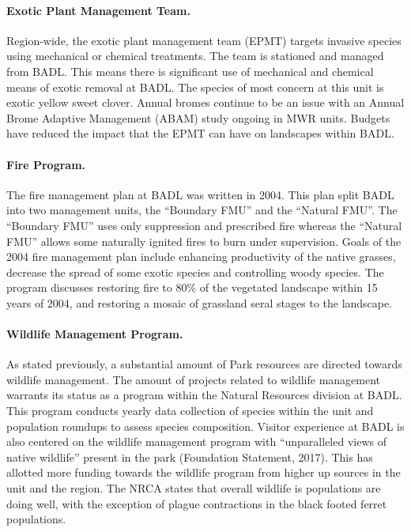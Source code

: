 \paragraph{Exotic Plant Management Team.} Region-wide, the exotic plant management team (EPMT) targets invasive species using mechanical or chemical treatments. 
The team is stationed and managed from BADL.
This means there is significant use of mechanical and chemical means of exotic removal at BADL. 
The species of most concern at this unit is exotic yellow sweet clover. 
Annual bromes continue to be an issue with an Annual Brome Adaptive Management (ABAM) study ongoing in MWR units.
Budgets have reduced the impact that the EPMT can have on landscapes within BADL.

\paragraph{Fire Program.} The fire management plan at BADL was written in 2004. 
This plan split BADL into two management units, the ``Boundary FMU'' and the ``Natural FMU''. 
The ``Boundary FMU'' uses only suppression and prescribed fire whereas the ``Natural FMU'' allows some naturally ignited fires to burn under supervision.
Goals of the 2004 fire management plan include enhancing productivity of the native grasses, decrease the spread of some exotic species and controlling woody species. 
The program discusses restoring fire to 80\% of the vegetated landscape within 15 years of 2004, and restoring a mosaic of grassland seral stages to the landscape.

\paragraph{Wildlife Management Program.} As stated previously, a substantial amount of Park resources are directed towards wildlife management. 
The amount of projects related to wildlife management warrants its status as a program within the Natural Resources division at BADL. 
This program conducts yearly data collection of species within the unit and population roundups to assess species composition. 
Visitor experience at BADL is also centered on the wildlife management program with ``unparalleled views of native wildlife'' present in the park (Foundation Statement, 2017). 
This has allotted more funding towards the wildlife program from higher up sources in the unit and the region. 
The NRCA states that overall wildlife is populations are doing well, with the exception of plague contractions in the black footed ferret populations.

